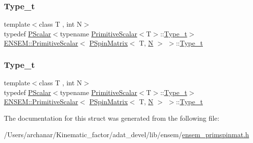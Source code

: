 \subsubsection{\texorpdfstring{Type\_t}{Type\_t}\hspace{0.1cm}{\footnotesize\ttfamily [1/2]}}
{\footnotesize\ttfamily template$<$class T , int N$>$ \\
typedef \mbox{\hyperlink{classENSEM_1_1PScalar}{P\+Scalar}}$<$typename \mbox{\hyperlink{structENSEM_1_1PrimitiveScalar}{Primitive\+Scalar}}$<$T$>$\+::\mbox{\hyperlink{structENSEM_1_1PrimitiveScalar_3_01PSpinMatrix_3_01T_00_01N_01_4_01_4_a90fbf3041c0d06689dfb63b1e61955f9}{Type\+\_\+t}}$>$ \mbox{\hyperlink{structENSEM_1_1PrimitiveScalar}{E\+N\+S\+E\+M\+::\+Primitive\+Scalar}}$<$ \mbox{\hyperlink{classENSEM_1_1PSpinMatrix}{P\+Spin\+Matrix}}$<$ T, \mbox{\hyperlink{operator__name__util_8cc_a7722c8ecbb62d99aee7ce68b1752f337}{N}} $>$ $>$\+::\mbox{\hyperlink{structENSEM_1_1PrimitiveScalar_3_01PSpinMatrix_3_01T_00_01N_01_4_01_4_a90fbf3041c0d06689dfb63b1e61955f9}{Type\+\_\+t}}}

\mbox{\label{structENSEM_1_1PrimitiveScalar_3_01PSpinMatrix_3_01T_00_01N_01_4_01_4_a90fbf3041c0d06689dfb63b1e61955f9}} 
\subsubsection{\texorpdfstring{Type\_t}{Type\_t}\hspace{0.1cm}{\footnotesize\ttfamily [2/2]}}
{\footnotesize\ttfamily template$<$class T , int N$>$ \\
typedef \mbox{\hyperlink{classENSEM_1_1PScalar}{P\+Scalar}}$<$typename \mbox{\hyperlink{structENSEM_1_1PrimitiveScalar}{Primitive\+Scalar}}$<$T$>$\+::\mbox{\hyperlink{structENSEM_1_1PrimitiveScalar_3_01PSpinMatrix_3_01T_00_01N_01_4_01_4_a90fbf3041c0d06689dfb63b1e61955f9}{Type\+\_\+t}}$>$ \mbox{\hyperlink{structENSEM_1_1PrimitiveScalar}{E\+N\+S\+E\+M\+::\+Primitive\+Scalar}}$<$ \mbox{\hyperlink{classENSEM_1_1PSpinMatrix}{P\+Spin\+Matrix}}$<$ T, \mbox{\hyperlink{operator__name__util_8cc_a7722c8ecbb62d99aee7ce68b1752f337}{N}} $>$ $>$\+::\mbox{\hyperlink{structENSEM_1_1PrimitiveScalar_3_01PSpinMatrix_3_01T_00_01N_01_4_01_4_a90fbf3041c0d06689dfb63b1e61955f9}{Type\+\_\+t}}}



The documentation for this struct was generated from the following file\+:\begin{DoxyCompactItemize}
\item 
/\+Users/archanar/\+Kinematic\+\_\+factor/adat\+\_\+devel/lib/ensem/\mbox{\hyperlink{lib_2ensem_2ensem__primspinmat_8h}{ensem\+\_\+primspinmat.\+h}}\end{DoxyCompactItemize}
